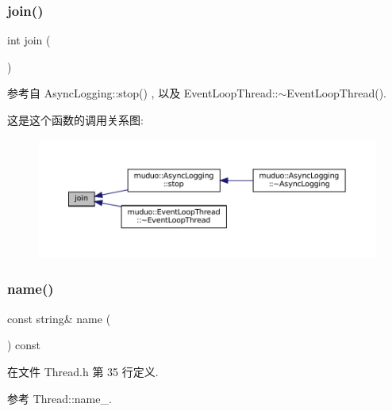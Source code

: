 \subsubsection{\texorpdfstring{join()}{join()}}
{\footnotesize\ttfamily int join (\begin{DoxyParamCaption}{ }\end{DoxyParamCaption})}



参考自 Async\+Logging\+::stop() , 以及 Event\+Loop\+Thread\+::$\sim$\+Event\+Loop\+Thread().

这是这个函数的调用关系图\+:
\nopagebreak
\begin{figure}[H]
\begin{center}
\leavevmode
\includegraphics[width=350pt]{classmuduo_1_1Thread_ac942067a7e5a314610c1e89ff801f3bd_icgraph}
\end{center}
\end{figure}
\mbox{\label{classmuduo_1_1Thread_a47f4f0a66d5a539e687100dc65462ced}} 
\subsubsection{\texorpdfstring{name()}{name()}}
{\footnotesize\ttfamily const string\& name (\begin{DoxyParamCaption}{ }\end{DoxyParamCaption}) const\hspace{0.3cm}{\ttfamily [inline]}}



在文件 Thread.\+h 第 35 行定义.



参考 Thread\+::name\+\_\+.

\mbox{\label{classmuduo_1_1Thread_a2191877eb828575b4a698e5b1009923d}} 
